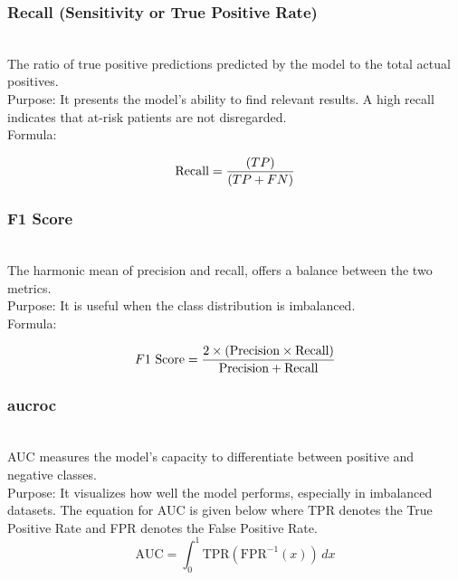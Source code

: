 \subsubsection{Recall (Sensitivity or True Positive Rate)} \leavevmode
\\The ratio of true positive predictions predicted by the model to the total actual positives.\\
Purpose: It presents the model’s ability to find relevant results. A high recall indicates that at-risk patients are not disregarded.\\
\noindent Formula: \vspace{-1.9 em}
\begin{center}
\[
\text{Recall} = \frac{(TP)}{(TP + FN)} \vspace{0.3cm}
\]
\end{center} 

\subsubsection{F1 Score} \leavevmode
\\The harmonic mean of precision and recall, offers a balance between the two metrics. \\
Purpose: It is useful when the class distribution is imbalanced.\\
\noindent Formula: \vspace{-1.9 em}
\begin{center}
\[
F1\ \text{Score} = \frac{2 \times (\text{Precision} \times \text{Recall})}{\text{Precision} + \text{Recall}} \vspace{0.3cm}
\] 
\end{center} 

\subsubsection{\gls{aucroc}} \leavevmode
\\AUC measures the model’s capacity to differentiate between positive and negative classes. \\
Purpose: It visualizes how well the model performs, especially in imbalanced datasets. The equation for AUC is given below where TPR denotes the True Positive Rate and FPR denotes the False Positive Rate. 
\[
\text{AUC} = \int_{0}^{1} \text{TPR}(\text{FPR}^{-1}(x)) \, dx
\]


